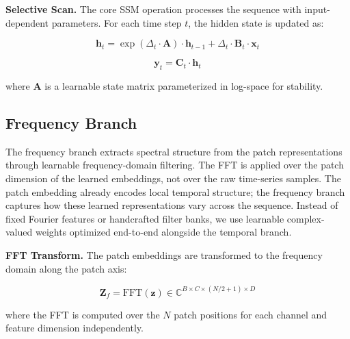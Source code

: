 \documentclass[symmetry,article,submit,pdftex,moreauthors]{Definitions/mdpi}
\begin{document}
\textbf{Selective Scan.} The core SSM operation processes the sequence with input-dependent parameters. For each time step $t$, the hidden state is updated as:
\begin{linenomath}
\begin{equation}
\mathbf{h}_t = \exp(\Delta_t \cdot \mathbf{A}) \cdot \mathbf{h}_{t-1} + \Delta_t \cdot \mathbf{B}_t \cdot \mathbf{x}_t
\end{equation}
\end{linenomath}
\begin{linenomath}
\begin{equation}
\mathbf{y}_t = \mathbf{C}_t \cdot \mathbf{h}_t
\end{equation}
\end{linenomath}
where $\mathbf{A}$ is a learnable state matrix parameterized in log-space for stability.

\subsection{Frequency Branch}

The frequency branch extracts spectral structure from the patch representations through learnable frequency-domain filtering. The FFT is applied over the patch dimension of the learned embeddings, not over the raw time-series samples. The patch embedding already encodes local temporal structure; the frequency branch captures how these learned representations vary across the sequence. Instead of fixed Fourier features or handcrafted filter banks, we use learnable complex-valued weights optimized end-to-end alongside the temporal branch.

\textbf{FFT Transform.} The patch embeddings are transformed to the frequency domain along the patch axis:
\begin{linenomath}
\begin{equation}
\mathbf{Z}_f = \text{FFT}(\mathbf{z}) \in \mathbb{C}^{B \times C \times (N/2+1) \times D}
\end{equation}
\end{linenomath}
where the FFT is computed over the $N$ patch positions for each channel and feature dimension independently.
\end{document}

